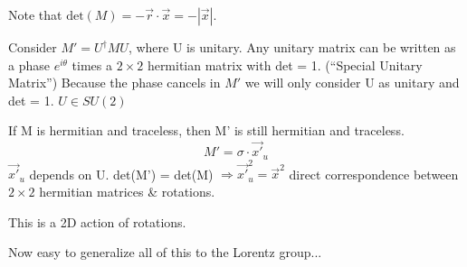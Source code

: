 {Note that $\textrm{det}(M) = - \vec{r}\cdot\vec{x} = - |\vec{x}|$.

Consider $M'=U^{\dagger}MU$, where U is unitary.
Any unitary matrix can be written as a phase $e^{i\theta}$ times a $2\times2$ hermitian matrix with det = 1.  (``Special Unitary Matrix'')
Because the phase cancels in $M'$ we will only consider U as unitary and det = 1. 
$U \in SU(2)$

If M is hermitian and traceless, then M' is still hermitian and traceless.
\begin{equation*}
M' = \sigma \cdot \vec{x'}_u
\end{equation*}
$\vec{x'}_{u} $ depends on U.  det(M') = det(M) $\Rightarrow \vec{x'}_u^2 = {\vec{x}}^2 $%
direct correspondence between $2\times2$ hermitian matrices \& rotations.

This is a 2D action of rotations.

Now easy to generalize all of this to the Lorentz group...

}



